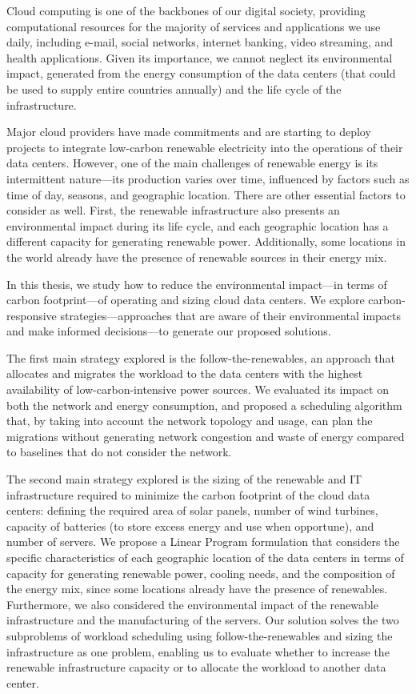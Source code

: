Cloud computing is one of the backbones of our digital society, providing computational resources for the majority of services and applications we use daily, including e-mail, social networks, internet banking, video streaming, and health applications. Given its importance, we cannot neglect its environmental impact, generated from the energy consumption of the data centers (that could be used to supply entire countries annually) and the life cycle of the infrastructure.

Major cloud providers have made commitments and are starting to deploy projects to integrate low-carbon renewable electricity into the operations of their data centers. However, one of the main challenges of renewable energy is its intermittent nature---its production varies over time, influenced by factors such as time of day, seasons, and geographic location. There are other essential factors to consider as well. First, the renewable infrastructure also presents an environmental impact during its life cycle, and each geographic location has a different capacity for generating renewable power. Additionally, some locations in the world already have the presence of renewable sources in their energy mix.

In this thesis, we study how to reduce the environmental impact---in terms of carbon footprint---of operating and sizing cloud data centers. We explore carbon-responsive strategies---approaches that are aware of their environmental impacts and make informed decisions---to generate our proposed solutions.

The first main strategy explored is the follow-the-renewables, an approach that allocates and migrates the workload to the data centers with the highest availability of low-carbon-intensive power sources. We evaluated its impact on both the network and energy consumption, and proposed a scheduling algorithm that, by taking into account the network topology and usage, can plan the migrations without generating network congestion and waste of energy compared to baselines that do not consider the network.

The second main strategy explored is the sizing of the renewable and IT infrastructure required to minimize the carbon footprint of the cloud data centers: defining the required area of solar panels, number of wind turbines, capacity of batteries (to store excess energy and use when opportune), and number of servers. We propose a Linear Program formulation that considers the specific characteristics of each geographic location of the data centers in terms of capacity for generating renewable power, cooling needs, and the composition of the energy mix, since some locations already have the presence of renewables. Furthermore, we also considered the environmental impact of the renewable infrastructure and the manufacturing of the servers. Our solution solves the two subproblems of workload scheduling using follow-the-renewables and sizing the infrastructure as one problem, enabling us to evaluate whether to increase the renewable infrastructure capacity or to allocate the workload to another data center.

